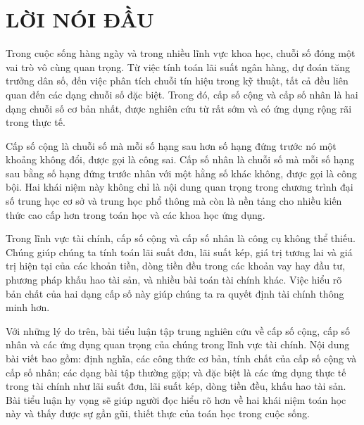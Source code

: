 \documentclass[12pt,a4paper]{report}
\begin{document}

\clearpage

\chapter*{LỜI NÓI ĐẦU}

\thispagestyle{plain}

Trong cuộc sống hàng ngày và trong nhiều lĩnh vực khoa học, chuỗi số đóng một vai trò vô cùng quan trọng. Từ việc tính toán lãi suất ngân hàng, dự đoán tăng trưởng dân số, đến việc phân tích chuỗi tín hiệu trong kỹ thuật, tất cả đều liên quan đến các dạng chuỗi số đặc biệt. Trong đó, cấp số cộng và cấp số nhân là hai dạng chuỗi số cơ bản nhất, được nghiên cứu từ rất sớm và có ứng dụng rộng rãi trong thực tế.

Cấp số cộng là chuỗi số mà mỗi số hạng sau hơn số hạng đứng trước nó một khoảng không đổi, được gọi là công sai. Cấp số nhân là chuỗi số mà mỗi số hạng sau bằng số hạng đứng trước nhân với một hằng số khác không, được gọi là công bội. Hai khái niệm này không chỉ là nội dung quan trọng trong chương trình đại số trung học cơ sở và trung học phổ thông mà còn là nền tảng cho nhiều kiến thức cao cấp hơn trong toán học và các khoa học ứng dụng.

Trong lĩnh vực tài chính, cấp số cộng và cấp số nhân là công cụ không thể thiếu. Chúng giúp chúng ta tính toán lãi suất đơn, lãi suất kép, giá trị tương lai và giá trị hiện tại của các khoản tiền, dòng tiền đều trong các khoản vay hay đầu tư, phương pháp khấu hao tài sản, và nhiều bài toán tài chính khác. Việc hiểu rõ bản chất của hai dạng cấp số này giúp chúng ta ra quyết định tài chính thông minh hơn.

Với những lý do trên, bài tiểu luận tập trung nghiên cứu về cấp số cộng, cấp số nhân và các ứng dụng quan trọng của chúng trong lĩnh vực tài chính. Nội dung bài viết bao gồm: định nghĩa, các công thức cơ bản, tính chất của cấp số cộng và cấp số nhân; các dạng bài tập thường gặp; và đặc biệt là các ứng dụng thực tế trong tài chính như lãi suất đơn, lãi suất kép, dòng tiền đều, khấu hao tài sản. Bài tiểu luận hy vọng sẽ giúp người đọc hiểu rõ hơn về hai khái niệm toán học này và thấy được sự gần gũi, thiết thực của toán học trong cuộc sống.

\end{document}
